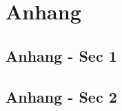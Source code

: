 \appendix
\chapter{Anhang}
\cleardoublepage
\newpage
\section{Anhang - Sec 1}
\cleardoublepage
\newpage
\section{Anhang - Sec 2}